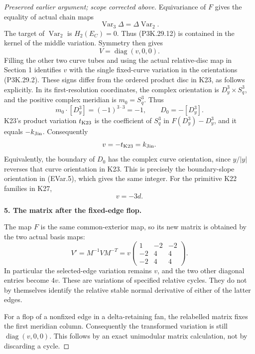 \begin{proof}[Preserved earlier argument; scope corrected above]
Equivariance of \(F\) gives the equality of actual chain
maps
\[
             \operatorname{Var}_3\Delta
                         =\Delta\operatorname{Var}_2.
                                                        \tag{P3K.29.13}
\]
The target of \(\operatorname{Var}_2\) is \(H_2(E_C)=0\).
Thus (P3K.29.12) is contained in the kernel of the middle
variation. Symmetry then gives
\[
                       V=\operatorname{diag}(v,0,0).
                                                        \tag{P3K.29.14}
\]
Filling the other two curve tubes and using the actual
relative-disc map in Section 1 identifies \(v\) with the
single fixed-curve variation in the orientations
(P3K.29.2). These signs differ from the ordered product
disc in K23, as follows explicitly. In its first-resolution
coordinates, the complex orientation is
\(D^3_y\times S^3_q\), and the positive complex meridian
is \(m_0=S^3_q\). Thus
\[
      m_0\cdot[D^3_y]=(-1)^{3\cdot3}=-1,\qquad
      D_0=-[D^3_y].
\]
K23's product variation \(t_{\rm K23}\) is the coefficient
of \(S^3_q\) in \(F(D^3_y)-D^3_y\), and it equals
\(-k_{\rm Jin}\). Consequently
\[
                v=-t_{\rm K23}=k_{\rm Jin}.
\]
Equivalently, the boundary of \(D_0\) has the complex
curve orientation, since \(y/|y|\) reverses that curve
orientation in K23. This is precisely the boundary-slope
orientation in (EVar.5), which gives the same integer.
For the primitive K22 families in K27,
\[
                              v=-3d.
                                                        \tag{P3K.29.15}
\]

\par\medskip\noindent\textbf{5. The matrix after the fixed-edge flop.}\enspace

The map \(F\) is the same common-exterior map, so its new
matrix is obtained by the two actual basis maps:
\[
 V'=M^{-1}VM^{-T}
   =v\begin{pmatrix}
       1&-2&-2\\
       -2&4&4\\
       -2&4&4
      \end{pmatrix}.                                   \tag{P3K.29.16}
\]
In particular the selected-edge variation remains \(v\),
and the two other diagonal entries become \(4v\).
These are variations of specified relative cycles.
They do not by themselves identify the relative stable
normal derivative of either of the latter edges.

For a flop of a nonfixed edge in a delta-retaining fan,
the relabelled matrix fixes the first meridian column.
Consequently the transformed variation is still
\(\operatorname{diag}(v,0,0)\). This follows by an exact
unimodular matrix calculation, not by discarding a cycle.


\end{proof}
